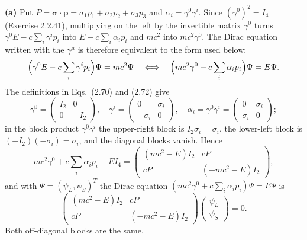 
\textbf{(a)} Put $P=\boldsymbol{\sigma}\cdot\mathbf p
=\sigma_1p_1+\sigma_2p_2+\sigma_3p_3$ and $\alpha_i=\gamma^0\gamma^i$.
Since $(\gamma^0)^2=I_4$ (Exercise 2.2.41), multiplying on the left by
the invertible matrix $\gamma^0$ turns $\gamma^0E-c\sum_i\gamma^ip_i$
into $E-c\sum_i\alpha_ip_i$ and $mc^2$ into $mc^2\gamma^0$. The Dirac
equation written with the $\gamma^\mu$ is therefore equivalent to the
form used below:
\[
\Bigl(\gamma^0E-c\sum_i\gamma^ip_i\Bigr)\Psi=mc^2\Psi
\quad\Longleftrightarrow\quad
\Bigl(mc^2\gamma^0+c\sum_i\alpha_ip_i\Bigr)\Psi=E\Psi.
\]
The definitions in Eqs.~(2.70) and (2.72) give
\[
\gamma^0=\begin{pmatrix}I_2&0\\0&-I_2\end{pmatrix},\quad
\gamma^i=\begin{pmatrix}0&\sigma_i\\-\sigma_i&0\end{pmatrix},\quad
\alpha_i=\gamma^0\gamma^i=
\begin{pmatrix}0&\sigma_i\\\sigma_i&0\end{pmatrix};
\]
in the block product $\gamma^0\gamma^i$ the upper-right block is
$I_2\sigma_i=\sigma_i$, the lower-left block is
$(-I_2)(-\sigma_i)=\sigma_i$, and the diagonal blocks vanish. Hence
\[
mc^2\gamma^0+c\sum_i\alpha_ip_i-EI_4
=\begin{pmatrix}(mc^2-E)I_2&cP\\cP&(-mc^2-E)I_2\end{pmatrix},
\]
and with $\Psi=(\psi_L,\psi_S)^T$ the Dirac equation
$(mc^2\gamma^0+c\sum_i\alpha_ip_i)\Psi=E\Psi$ is
\[
\boxed{\begin{pmatrix}
(mc^2-E)I_2&cP\\cP&(-mc^2-E)I_2
\end{pmatrix}\begin{pmatrix}\psi_L\\\psi_S\end{pmatrix}=0}.
\]
Both off-diagonal blocks are the same.

